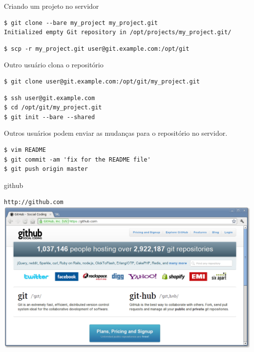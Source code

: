 \documentclass[portuguese,brazil]{beamer}
\begin{document}
\begin{frame}[fragile]{Criando um projeto no servidor}
\begin{verbatim}
$ git clone --bare my_project my_project.git
Initialized empty Git repository in /opt/projects/my_project.git/
\end{verbatim}
\pause
\begin{verbatim}
$ scp -r my_project.git user@git.example.com:/opt/git
\end{verbatim}
\pause
\begin{center}
Outro usuário clona o repositório
\end{center}
\begin{verbatim}
$ git clone user@git.example.com:/opt/git/my_project.git
\end{verbatim}
\pause
\begin{verbatim}
$ ssh user@git.example.com
$ cd /opt/git/my_project.git
$ git init --bare --shared
\end{verbatim}
\end{frame}

\begin{frame}[fragile]
\begin{center}
Outros usuários podem enviar as mudanças para o repositório no servidor.
\end{center}
\begin{verbatim}
$ vim README
$ git commit -am 'fix for the README file'
$ git push origin master
\end{verbatim}
\end{frame}

\begin{frame}{github}
\begin{center}
\texttt{http://github.com}
\includegraphics[scale=.3]{images/github.png}
\end{center}
\end{frame}
\end{document}
